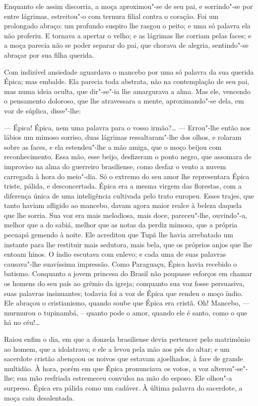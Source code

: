 Enquanto ele assim discorria, a moça aproximou"-se de seu pai, e
sorrindo"-se por entre lágrimas, estreitou"-o com ternura filial contra o
coração. Foi um prolongado abraço: um profundo suspiro lhe rasgou o
peito; e uma só palavra ela não proferiu. E tornava a apertar o velho; e
as lágrimas lhe corriam pelas faces; e a moça parecia não se poder
separar do pai, que chorava de alegria, sentindo"-se abraçar por sua
filha querida.

Com indizível ansiedade aguardava o mancebo por uma só palavra da sua
querida Épica; mas embalde. Ela parecia toda abstrata, não na
contemplação de seu pai, mas numa ideia oculta, que dir"-se"-ia lhe
amargurava a alma. Mas ele, vencendo o pensamento doloroso, que lhe
atravessara a mente, aproximando"-se dela, em voz de súplica, disse"-lhe:

--- Épica! Épica, nem uma palavra para o vosso irmão?\ldots{} --- Errou"-lhe
então nos lábios um mimoso sorriso, duas lágrimas ressaltaram"-lhe dos
olhos, e rolaram sobre as faces, e ela estendeu"-lhe a mão amiga, que o
moço beijou com reconhecimento. Essa mão, esse beijo, desfizeram o ponto
negro, que assomara de improviso na alma do guerreiro brasiliense, como
desfaz o vento a nuvem carregada à hora do meio"-dia. Só o extremo do seu
amor lhe representara Épica triste, pálida, e desconcertada. Épica era a
mesma virgem das florestas, com a diferença única de uma inteligência
cultivada pelo trato europeu. Esses trajes, que tanto haviam afligido ao
mancebo, davam agora maior realce à beleza daquela que lhe sorria. Sua
voz era mais melodiosa, mais doce, pareceu"-lhe, ouvindo"-a, melhor que a
do sabiá, melhor que as notas da perdiz mimosa, que a própria pecuapá
gemendo à noite. Ele acreditou que Tupã lhe havia arrebatado um instante
para lhe restituir mais sedutora, mais bela, que os próprios anjos que
lhe entoam hinos. O índio escutava com enlevo; e cada uma de suas
palavras causava"-lhe suavíssima impressão. Como Paraguaçu, Épica havia
recebido o batismo. Conquanto a jovem princesa do Brasil não poupasse
esforços em chamar os homens do seu país ao grêmio da igreja; conquanto
sua voz fosse persuasiva, suas palavras insinuantes; todavia foi a voz
de Épica que rendeu o moço índio. Ele abraçou o cristianismo, quando
soube que Épica era cristã. Oh! Mancebo, --- murmurou o tupinambá, --
quanto pode o amor, quando ele é santo, como o que há no céu!\ldots{}

Raiou enfim o dia, em que a donzela brasiliense devia pertencer pelo
matrimônio ao homem, que a idolatrava; e ele a levou pela mão aos pés do
altar; e um sacerdote cristão abençoou os noivos que estavam ajoelhados,
à face de grande multidão. À hora, porém em que Épica pronunciava os
votos, a voz alterou"-se"-lhe; sua mão resfriada estremeceu convulsa na
mão do esposo. Ele olhou"-a surpreso. Épica era pálida como um cadáver. À
última palavra do sacerdote, a moça caiu desalentada.

